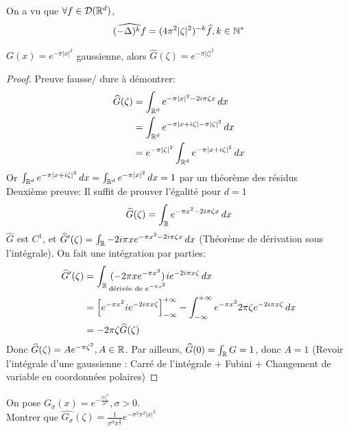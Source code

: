 \documentclass[]{report}
\begin{document}
    \begin{re}{}{}
        On a vu que $\forall f\in \mathcal{D}(\mathbb{R}^d)$,
        \[\widehat{(-\Delta)^k f}=(4\pi^2 |\zeta|^2)^{-k}\widehat{f},k\in \mathbb{N}^*\]
    \end{re}

    \begin{prop}{}{}
        $G(x)=e^{-\pi|x|^2}$ gaussienne, alors $\widehat{G}(\zeta)=e^{-\pi|\zeta|^2}$
    \end{prop}

    \begin{proof}
        Preuve fausse/ dure à démontrer:
        \begin{align*}
            \widehat{G}(\zeta)&=\int_{\mathbb{R}^d}e^{-\pi|x|^2-2i\pi\zeta x}\, dx\\
            &=\int_{\mathbb{R}^d}e^{-\pi|x+i\zeta|-\pi|\zeta|^2}\, dx\\
            &=e^{-\pi|\zeta|^2}\int_{\mathbb{R}^d}e^{-\pi|x+i\zeta|^2}\, dx
        \end{align*}
        Or $\int_{\mathbb{R}^d}e^{-\pi|x+i\zeta|^2}\, dx=\int_{\mathbb{R}^d}e^{-\pi|x|^2}\, dx=1$ par un théorème des résidus\\
        Deuxième preuve: Il suffit de prouver l'égalité pour $d=1$
        \[\widehat{G}(\zeta)=\int_{\mathbb{R}} e^{-\pi x^2-2i\pi \zeta x}\, dx\]
        $\widehat{G}$ est $C^1$, et $\widehat{G}'(\zeta)=\int_{\mathbb{R}}-2i\pi x e^{-\pi x^2-2i\pi \zeta x}\, dx$ (Théorème de dérivation sous l'intégrale). On fait une intégration par parties:
        \begin{align*}
            \widehat{G}'(\zeta)&=\int_{\mathbb{R}}\underset{\text{dérivée de $e^{-\pi x^2}$}}{(-2\pi x e^{-\pi x^2})}i e^{-2i\pi x\zeta }\, dx\\
            &=\left[e^{-\pi x^2}i e^{-2i\pi x\zeta}\right]_{-\infty}^{+\infty}-\int_{-\infty}^{+\infty}e^{-\pi x^2}2\pi \zeta e^{-2i\pi x\zeta}\, dx\\
            &=-2\pi \zeta \widehat{G}(\zeta)
        \end{align*}
        Donc $\widehat{G}(\zeta)=A e^{-\pi \zeta^2},A\in \mathbb{R}$. Par ailleurs, $\widehat{G}(0)=\int_{\mathbb{R}}G=1$, donc $A=1$ (Revoir l'intégrale d'une gaussienne : Carré de l'intégrale + Fubini + Changement de variable en coordonnées polaires)
    \end{proof}

    \begin{exo}{}{}
        On pose $G_\sigma(x)=e^{-\frac{|x|^2}{\sigma^2}}, \sigma>0$.\\
        Montrer que $\widehat{G_\sigma}(\zeta)=\frac{1}{\sigma^d \pi^{\frac{d}{2}}}e^{-\sigma^2\pi^2 |x|^2}$
    \end{exo}
\end{document}
